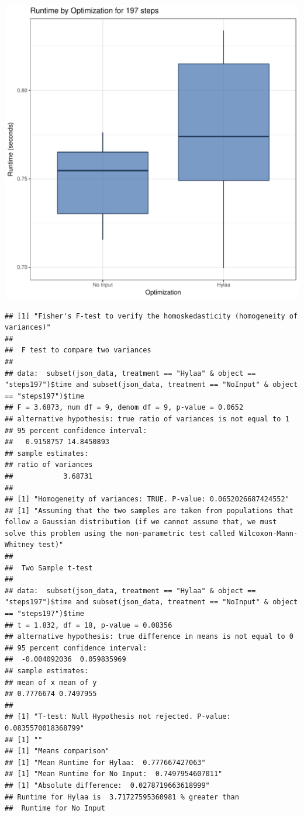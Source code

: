 \documentclass{article}\usepackage[]{graphicx}\usepackage[]{color}
\makeatletter
\def\maxwidth{ %
  \ifdim\Gin@nat@width>\linewidth
    \linewidth
  \else
    \Gin@nat@width
  \fi
}
\newenvironment{kframe}{%
 \def\at@end@of@kframe{}%
 \ifinner\ifhmode%
  \def\at@end@of@kframe{\end{minipage}}%
  \begin{minipage}{\columnwidth}%
 \fi\fi%
 \def\FrameCommand##1{\hskip\@totalleftmargin \hskip-\fboxsep
 \colorbox{shadecolor}{##1}\hskip-\fboxsep
     \hskip-\linewidth \hskip-\@totalleftmargin \hskip\columnwidth}%
 \MakeFramed {\advance\hsize-\width
   \@totalleftmargin\z@ \linewidth\hsize
   \@setminipage}}%
 {\par\unskip\endMakeFramed%
 \at@end@of@kframe}
\newenvironment{knitrout}{}{} %
\makeatother
\begin{document}
\begin{knitrout}
\color{fgcolor}
\includegraphics[width=\maxwidth]{figure/RH4_steps197-1} 
\begin{kframe}\begin{verbatim}
## [1] "Fisher's F-test to verify the homoskedasticity (homogeneity of variances)"
## 
## 	F test to compare two variances
## 
## data:  subset(json_data, treatment == "Hylaa" & object == "steps197")$time and subset(json_data, treatment == "NoInput" & object == "steps197")$time
## F = 3.6873, num df = 9, denom df = 9, p-value = 0.0652
## alternative hypothesis: true ratio of variances is not equal to 1
## 95 percent confidence interval:
##   0.9158757 14.8450893
## sample estimates:
## ratio of variances 
##            3.68731 
## 
## [1] "Homogeneity of variances: TRUE. P-value: 0.0652026687424552"
## [1] "Assuming that the two samples are taken from populations that follow a Gaussian distribution (if we cannot assume that, we must solve this problem using the non-parametric test called Wilcoxon-Mann-Whitney test)"
## 
## 	Two Sample t-test
## 
## data:  subset(json_data, treatment == "Hylaa" & object == "steps197")$time and subset(json_data, treatment == "NoInput" & object == "steps197")$time
## t = 1.832, df = 18, p-value = 0.08356
## alternative hypothesis: true difference in means is not equal to 0
## 95 percent confidence interval:
##  -0.004092036  0.059835969
## sample estimates:
## mean of x mean of y 
## 0.7776674 0.7497955 
## 
## [1] "T-test: Null Hypothesis not rejected. P-value: 0.0835570018368799"
## [1] ""
## [1] "Means comparison"
## [1] "Mean Runtime for Hylaa:  0.777667427063"
## [1] "Mean Runtime for No Input:  0.7497954607011"
## [1] "Absolute difference:  0.0278719663618999"
## Runtime for Hylaa is  3.71727595360981 % greater than 
##  Runtime for No Input
\end{verbatim}
\end{kframe}
\end{knitrout}
\end{document}
